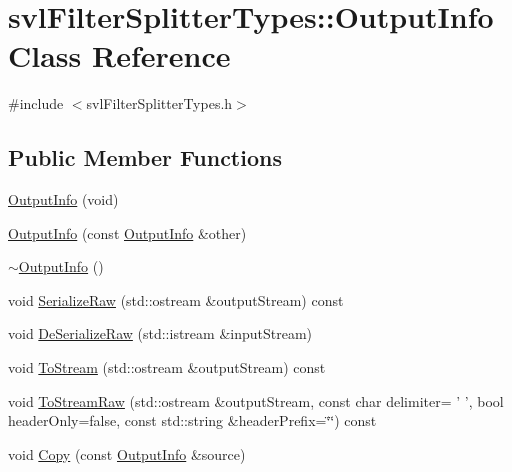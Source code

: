 \hypertarget{classsvl_filter_splitter_types_1_1_output_info}{\section{svl\-Filter\-Splitter\-Types\-:\-:Output\-Info Class Reference}
\label{classsvl_filter_splitter_types_1_1_output_info}
}


{\ttfamily \#include $<$svl\-Filter\-Splitter\-Types.\-h$>$}

\subsection*{Public Member Functions}
\begin{DoxyCompactItemize}
\item 
\hyperlink{classsvl_filter_splitter_types_1_1_output_info_ab97210df69e7f46916349f31bb2d545d}{Output\-Info} (void)
\item 
\hyperlink{classsvl_filter_splitter_types_1_1_output_info_ab04c42959511415b50087496d092a01a}{Output\-Info} (const \hyperlink{classsvl_filter_splitter_types_1_1_output_info}{Output\-Info} \&other)
\item 
\hyperlink{classsvl_filter_splitter_types_1_1_output_info_ab09d5ae63d0dadf7c132b75a7496beb2}{$\sim$\-Output\-Info} ()
\item 
void \hyperlink{classsvl_filter_splitter_types_1_1_output_info_aac5c3e17cd59b05f79cbc505caa7d572}{Serialize\-Raw} (std\-::ostream \&output\-Stream) const 
\item 
void \hyperlink{classsvl_filter_splitter_types_1_1_output_info_abf49c2f9e38541294960e45de69c93df}{De\-Serialize\-Raw} (std\-::istream \&input\-Stream)
\item 
void \hyperlink{classsvl_filter_splitter_types_1_1_output_info_a918726c7bcd5df9b8986038295b8c227}{To\-Stream} (std\-::ostream \&output\-Stream) const 
\item 
void \hyperlink{classsvl_filter_splitter_types_1_1_output_info_a6883a04d20297de0d797362ca7058de9}{To\-Stream\-Raw} (std\-::ostream \&output\-Stream, const char delimiter= ' ', bool header\-Only=false, const std\-::string \&header\-Prefix=\char`\"{}\char`\"{}) const 
\item 
void \hyperlink{classsvl_filter_splitter_types_1_1_output_info_a8b413c7ed4f052ee1be8086967263aa8}{Copy} (const \hyperlink{classsvl_filter_splitter_types_1_1_output_info}{Output\-Info} \&source)
\item 

\end{DoxyCompactItemize}
